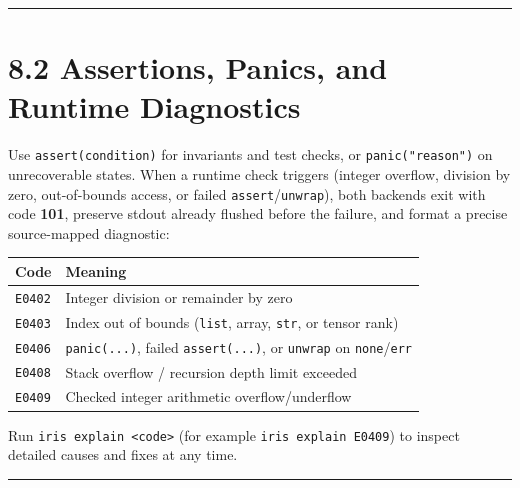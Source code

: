 \documentclass[
  english,
  oneside]{book}
\newcounter{none} %
\begin{document}
\begin{center}\rule{0.5\linewidth}{0.5pt}\end{center}

\section{8.2 Assertions, Panics, and Runtime
Diagnostics}\label{assertions-panics-and-runtime-diagnostics}

Use \texttt{assert(condition)} for invariants and test checks, or
\texttt{panic("reason")} on unrecoverable states. When a runtime check
triggers (integer overflow, division by zero, out-of-bounds access, or
failed \texttt{assert}/\texttt{unwrap}), both backends exit with code
\textbf{101}, preserve stdout already flushed before the failure, and
format a precise source-mapped diagnostic:

{\def\LTcaptype{none} %
\begin{longtable}[]{@{}
  >{\raggedright\arraybackslash}p{}
  >{\raggedright\arraybackslash}p{}@{}}
\toprule\noalign{}
\begin{minipage}[b]{\linewidth}\raggedright
Code
\end{minipage} & \begin{minipage}[b]{\linewidth}\raggedright
Meaning
\end{minipage} \\
\midrule\noalign{}
\endhead
\bottomrule\noalign{}
\endlastfoot
\texttt{E0402} & Integer division or remainder by zero \\
\texttt{E0403} & Index out of bounds (\texttt{list}, array,
\texttt{str}, or tensor rank) \\
\texttt{E0406} & \texttt{panic(...)}, failed \texttt{assert(...)}, or
\texttt{unwrap} on \texttt{none}/\texttt{err} \\
\texttt{E0408} & Stack overflow / recursion depth limit exceeded \\
\texttt{E0409} & Checked integer arithmetic overflow/underflow \\
\end{longtable}
}

Run \texttt{iris\ explain\ \textless{}code\textgreater{}} (for example
\texttt{iris\ explain\ E0409}) to inspect detailed causes and fixes at
any time.

\begin{center}\rule{0.5\linewidth}{0.5pt}\end{center}
\end{document}
